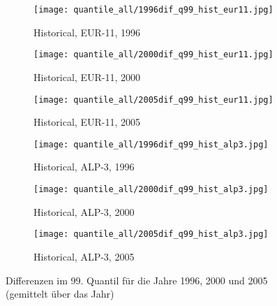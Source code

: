 \begin{figure}
	\begin{subfigure}{0.32\textwidth}
		\texttt{[image: quantile\_all/1996dif\_q99\_hist\_eur11.jpg]}
		\caption{Historical, EUR-11, 1996}
	\end{subfigure}
	\begin{subfigure}{0.32\textwidth}
		\texttt{[image: quantile\_all/2000dif\_q99\_hist\_eur11.jpg]}
		\caption{Historical, EUR-11, 2000}
	\end{subfigure}
	\begin{subfigure}{0.32\textwidth}
		\texttt{[image: quantile\_all/2005dif\_q99\_hist\_eur11.jpg]}
		\caption{Historical, EUR-11, 2005}
	\end{subfigure}
	\begin{subfigure}{0.32\textwidth}
		\texttt{[image: quantile\_all/1996dif\_q99\_hist\_alp3.jpg]}
		\caption{Historical, ALP-3, 1996}
	\end{subfigure}
	\begin{subfigure}{0.32\textwidth}
		\texttt{[image: quantile\_all/2000dif\_q99\_hist\_alp3.jpg]}
		\caption{Historical, ALP-3, 2000}
	\end{subfigure}
	\begin{subfigure}{0.32\textwidth}
		\texttt{[image: quantile\_all/2005dif\_q99\_hist\_alp3.jpg]}
		\caption{Historical, ALP-3, 2005}
	\end{subfigure}
	\caption{Differenzen im 99. Quantil für die Jahre 1996, 2000 und 2005 (gemittelt über das Jahr)}
	\label{fig:quantile_alp3_1}
\end{figure}

